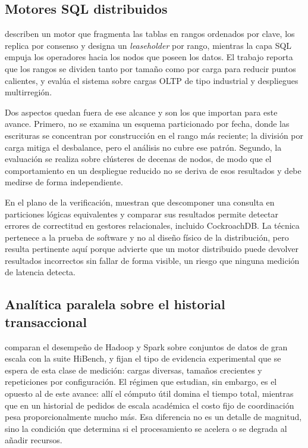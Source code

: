 \documentclass[12pt]{article}
\begin{document}
    \subsection{Motores SQL distribuidos}

    \textcite{taft2020} describen un motor que fragmenta las tablas en rangos ordenados por clave, los replica por consenso y designa un \emph{leaseholder} por rango, mientras la capa SQL empuja los operadores hacia los nodos que poseen los datos. El trabajo reporta que los rangos se dividen tanto por tamaño como por carga para reducir puntos calientes, y evalúa el sistema sobre cargas OLTP de tipo industrial y despliegues multirregión.

    Dos aspectos quedan fuera de ese alcance y son los que importan para este avance. Primero, no se examina un esquema particionado por fecha, donde las escrituras se concentran por construcción en el rango más reciente; la división por carga mitiga el desbalance, pero el análisis no cubre ese patrón. Segundo, la evaluación se realiza sobre clústeres de decenas de nodos, de modo que el comportamiento en un despliegue reducido no se deriva de esos resultados y debe medirse de forma independiente.

    En el plano de la verificación, \textcite{rigger2020querypartitioning} muestran que descomponer una consulta en particiones lógicas equivalentes y comparar sus resultados permite detectar errores de correctitud en gestores relacionales, incluido CockroachDB. La técnica pertenece a la prueba de software y no al diseño físico de la distribución, pero resulta pertinente aquí porque advierte que un motor distribuido puede devolver resultados incorrectos sin fallar de forma visible, un riesgo que ninguna medición de latencia detecta.

    \subsection{Analítica paralela sobre el historial transaccional}

    \textcite{ahmed2020} comparan el desempeño de Hadoop y Spark sobre conjuntos de datos de gran escala con la suite HiBench, y fijan el tipo de evidencia experimental que se espera de esta clase de medición: cargas diversas, tamaños crecientes y repeticiones por configuración. El régimen que estudian, sin embargo, es el opuesto al de este avance: allí el cómputo útil domina el tiempo total, mientras que en un historial de pedidos de escala académica el costo fijo de coordinación pesa proporcionalmente mucho más. Esa diferencia no es un detalle de magnitud, sino la condición que determina si el procesamiento se acelera o se degrada al añadir recursos.
\end{document}
